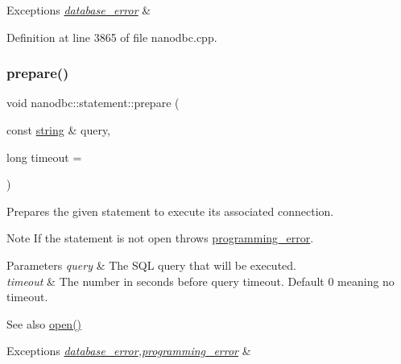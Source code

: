 \begin{DoxyExceptions}{Exceptions}
{\em \mbox{\hyperlink{classnanodbc_1_1database__error}{database\+\_\+error}}} & \\
\hline
\end{DoxyExceptions}


Definition at line 3865 of file nanodbc.\+cpp.

\mbox{\label{classnanodbc_1_1statement_a811a7bdbdea77b59af4aed8eddbc6840}} 
\subsubsection{\texorpdfstring{prepare()}{prepare()}\hspace{0.1cm}{\footnotesize\ttfamily [2/2]}}
{\footnotesize\ttfamily void nanodbc\+::statement\+::prepare (\begin{DoxyParamCaption}\item[{const \mbox{\hyperlink{namespacenanodbc_abfc0ece56278e590911ec8352774c212}{string}} \&}]{query,  }\item[{long}]{timeout = {} }\end{DoxyParamCaption})}



Prepares the given statement to execute its associated connection. 

\begin{DoxyNote}{Note}
If the statement is not open throws \mbox{\hyperlink{classnanodbc_1_1programming__error}{programming\+\_\+error}}. 
\end{DoxyNote}

\begin{DoxyParams}{Parameters}
{\em query} & The S\+QL query that will be executed. \\
\hline
{\em timeout} & The number in seconds before query timeout. Default 0 meaning no timeout. \\
\hline
\end{DoxyParams}
\begin{DoxySeeAlso}{See also}
\mbox{\hyperlink{classnanodbc_1_1statement_a473ec2d726f6d8acc42ce0f5f6d1b967}{open()}} 
\end{DoxySeeAlso}

\begin{DoxyExceptions}{Exceptions}
{\em \mbox{\hyperlink{classnanodbc_1_1database__error}{database\+\_\+error}},\mbox{\hyperlink{classnanodbc_1_1programming__error}{programming\+\_\+error}}} & \\
\hline
\end{DoxyExceptions}


